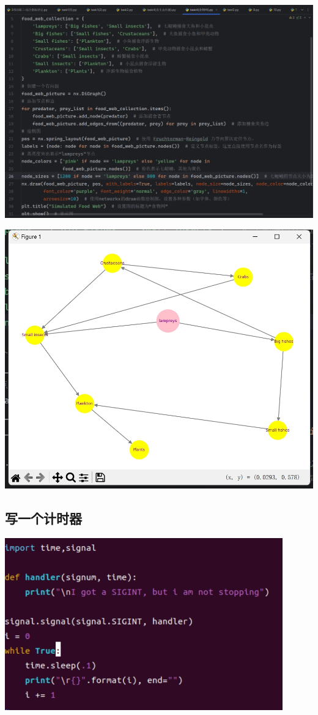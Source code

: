 \documentclass[UTF8,a4paper]{ctexart}
\begin{document}
\begin{sloppypar}
	\includegraphics[width = 18cm]{28.1}
	
	\includegraphics[width = 14cm]{28.2}
	
	\subsection{写一个计时器}
	
	\includegraphics[width = 12cm]{29.1}
	

\end{sloppypar}
\end{document}
